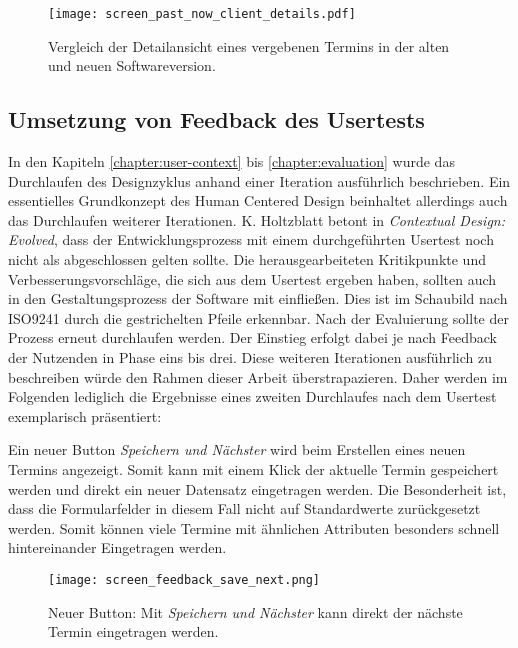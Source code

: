 \begin{figure}[H]
    \caption{Vergleich der Detailansicht eines vergebenen Termins in der alten und neuen Softwareversion.}
    \centering
    \texttt{[image: screen\_past\_now\_client\_details.pdf]}
\end{figure}

\subsection*{Umsetzung von Feedback des Usertests}
\label{paragraph:weitereIteration}

In den Kapiteln \ref{chapter:user-context} bis \ref{chapter:evaluation} wurde
das Durchlaufen des Designzyklus anhand einer Iteration ausführlich
beschrieben. Ein essentielles Grundkonzept des Human Centered Design beinhaltet
allerdings auch das Durchlaufen weiterer Iterationen\cite{hcd}. K. Holtzblatt
betont in \textit{Contextual Design: Evolved}, dass der Entwicklungsprozess mit
einem durchgeführten Usertest noch nicht als abgeschlossen gelten sollte. Die
herausgearbeiteten Kritikpunkte und Verbesserungsvorschläge, die sich aus dem
Usertest ergeben haben, sollten auch in den Gestaltungsprozess der Software mit
einfließen\cite{holtzblattCDEvolved}. Dies ist im Schaubild nach ISO9241 durch
die gestrichelten Pfeile erkennbar. Nach der Evaluierung sollte der Prozess
erneut durchlaufen werden. Der Einstieg erfolgt dabei je nach Feedback der
Nutzenden in Phase eins bis drei\cite{ISO9241}. Diese weiteren Iterationen
ausführlich zu beschreiben würde den Rahmen dieser Arbeit überstrapazieren.
Daher werden im Folgenden lediglich die Ergebnisse eines zweiten Durchlaufes
nach dem Usertest exemplarisch präsentiert:

Ein neuer Button \textit{Speichern und Nächster} wird beim Erstellen eines
neuen Termins angezeigt. Somit kann mit einem Klick der aktuelle Termin
gespeichert werden und direkt ein neuer Datensatz eingetragen werden. Die
Besonderheit ist, dass die Formularfelder in diesem Fall nicht auf
Standardwerte zurückgesetzt werden. Somit können viele Termine mit ähnlichen
Attributen besonders schnell hintereinander Eingetragen werden.

\begin{figure}[H]
    \caption{Neuer Button: Mit \textit{Speichern und Nächster} kann direkt der nächste Termin eingetragen werden.}
    \centering
    \texttt{[image: screen\_feedback\_save\_next.png]}
\end{figure}

